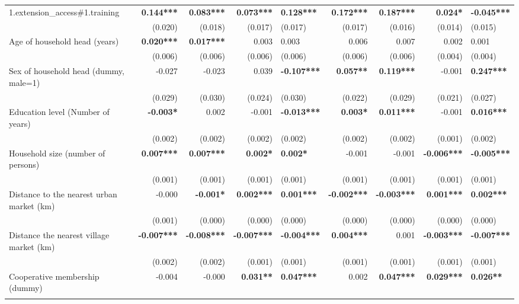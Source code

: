 \documentclass[
]{article}
\begin{document}
\begin{landscape}
\begin{longtable}[t]{lrrrlrrrl}
\endfoot
\bottomrule
\endlastfoot
1.extension\_access\#1.training & \textbf{0.144***} & \textbf{0.083***} & \textbf{0.073***} & \textbf{0.128***} & \textbf{0.172***} & \textbf{0.187***} & \textbf{0.024*} & \textbf{-0.045***}\\
 & (0.020) & (0.018) & (0.017) & (0.017) & (0.017) & (0.016) & (0.014) & (0.015)\\
Age of household head (years) & \textbf{0.020***} & \textbf{0.017***} & 0.003 & 0.003 & 0.006 & 0.007 & 0.002 & 0.001\\
 & (0.006) & (0.006) & (0.006) & (0.006) & (0.006) & (0.006) & (0.004) & (0.004)\\
Sex of household head (dummy, male=1) & -0.027 & -0.023 & 0.039 & \textbf{-0.107***} & \textbf{0.057**} & \textbf{0.119***} & -0.001 & \textbf{0.247***}\\
\addlinespace
 & (0.029) & (0.030) & (0.024) & (0.030) & (0.022) & (0.029) & (0.021) & (0.027)\\
Education level (Number of years) & \textbf{-0.003*} & 0.002 & -0.001 & \textbf{-0.013***} & \textbf{0.003*} & \textbf{0.011***} & -0.001 & \textbf{0.016***}\\
 & (0.002) & (0.002) & (0.002) & (0.002) & (0.002) & (0.002) & (0.001) & (0.002)\\
Household size (number of persons) & \textbf{0.007***} & \textbf{0.007***} & \textbf{0.002*} & \textbf{0.002*} & -0.001 & -0.001 & \textbf{-0.006***} & \textbf{-0.005***}\\
 & (0.001) & (0.001) & (0.001) & (0.001) & (0.001) & (0.001) & (0.001) & (0.001)\\
\addlinespace
Distance to the nearest urban market (km) & -0.000 & \textbf{-0.001*} & \textbf{0.002***} & \textbf{0.001***} & \textbf{-0.002***} & \textbf{-0.003***} & \textbf{0.001***} & \textbf{0.002***}\\
 & (0.001) & (0.000) & (0.000) & (0.000) & (0.000) & (0.000) & (0.000) & (0.000)\\
Distance the nearest village market (km) & \textbf{-0.007***} & \textbf{-0.008***} & \textbf{-0.007***} & \textbf{-0.004***} & \textbf{0.004***} & 0.001 & \textbf{-0.003***} & \textbf{-0.007***}\\
 & (0.002) & (0.002) & (0.001) & (0.001) & (0.001) & (0.001) & (0.001) & (0.001)\\
Cooperative membership (dummy) & -0.004 & -0.000 & \textbf{0.031**} & \textbf{0.047***} & 0.002 & \textbf{0.047***} & \textbf{0.029***} & \textbf{0.026**}\\
\addlinespace

\end{longtable}
\end{landscape}
\end{document}
